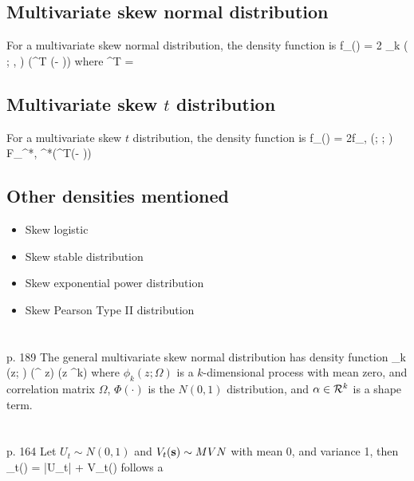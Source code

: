 \documentclass[11pt]{article}
\begin{document}
\subsection*{Multivariate skew normal distribution}
For a multivariate skew normal distribution, the density function is
\beqn
    f_{\bY}(\by) = 2 \phi_k ( \by; \bmu, \bOmega) \Phi(\blambda^T (\by - \bmu))
\eeqn
where
\beqn
    \blambda^T = 
\eeqn

\subsection*{Multivariate skew $t$ distribution}
For a multivariate skew $t$ distribution, the density function is 
\beqn
    f_{\bY}(\by) = 2f_{\nu, \tau}(\by; \bmu; \bOmega) F_{\nu^*, \tau^*}(\blambda^T(\by - \bmu))
\eeqn

\subsection*{Other densities mentioned}
\begin{itemize}
    \item Skew logistic
    \item Skew stable distribution
    \item Skew exponential power distribution
    \item Skew Pearson Type II distribution
\end{itemize}

\section*{\citep{Sahu2003}}

\section*{\citep{Gupta2004}}
p. 189
The general multivariate skew normal distribution has density function
 \phi_k (z; \Omega) \Phi (\alpha^{} z) \qquad (z \in \calR^k)
\eeqn
where $\phi_k(z; \Omega)$ is a $k$-dimensional process with mean zero, and correlation matrix $\Omega$, $\Phi( \cdot)$ is the $N(0, 1)$ distribution, and $\alpha \in {\cal R}^k$ is a shape term.

\section*{\citep{Allard2007}}

\section*{\citep{Zhang2010}}

\section*{\citep{Minozzo2012}}
p. 164
Let $U_t \sim N(0, 1)$ and $V_t(\mbox{\bf s}) \sim MVN$ with mean 0, and variance 1, then 
\beqn
    \bY_t(\bs) = \sigma \delta |U_t| + \sigma {} V_t(\bs)
\eeqn
follows a 



\end{document}
